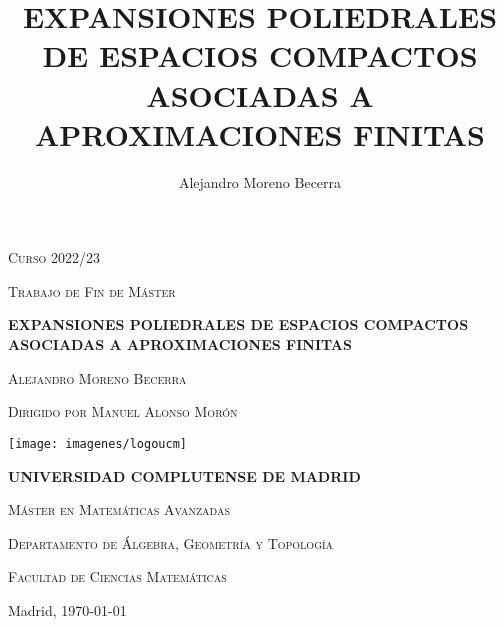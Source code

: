 \documentclass[twoside,reqno, 12pt]{amsbook}
\author{Alejandro Moreno Becerra}
\title{EXPANSIONES POLIEDRALES DE ESPACIOS COMPACTOS ASOCIADAS A APROXIMACIONES FINITAS}
\theoremstyle{definition}
\theoremstyle{definition}
\theoremstyle{definition}
\theoremstyle{definition}
\theoremstyle{definition}
\theoremstyle{definition}
\theoremstyle{definition}
\numberwithin{figure}{chapter} %
\begin{document}
\begin{titlepage}

\begin{center}
\textsc{Curso 2022/23}

\vspace*{0.25cm}

\textsc{Trabajo de Fin de Máster}


\vspace*{0.5cm}

{\large \textbf{EXPANSIONES POLIEDRALES DE ESPACIOS COMPACTOS ASOCIADAS A APROXIMACIONES FINITAS}}

\vspace*{0.5cm}

\textsc{Alejandro Moreno Becerra}

\vspace*{0.25cm}

\textsc{Dirigido por Manuel Alonso Morón}


\vspace*{0.8cm}

\texttt{[image: imagenes/logoucm]}

\vspace*{0.8cm}
{\large \textbf{UNIVERSIDAD COMPLUTENSE DE MADRID}}

\vspace*{0.8cm}
\textsc{Máster en Matemáticas Avanzadas}


\vspace*{0.8cm}
\textsc{Departamento de Álgebra, Geometría y Topología}

\vspace*{0.25cm}
\textsc{Facultad de Ciencias Matemáticas}


\vspace*{6cm}

Madrid, \today

\thispagestyle{empty}

\end{center}
\end{titlepage}
\end{document}
